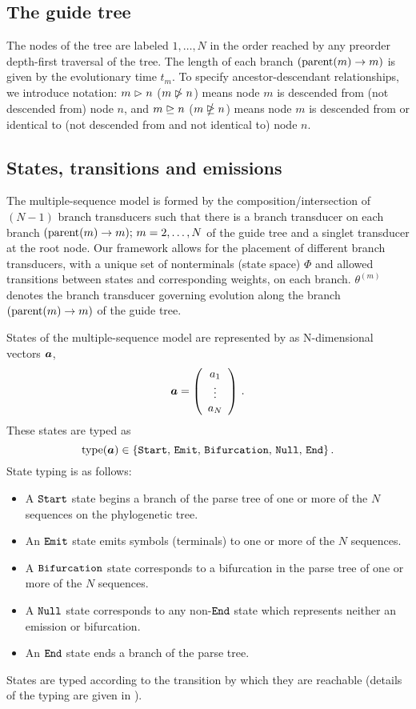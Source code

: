 \documentclass[10pt]{article}
\begin{document}
\subsection{The guide tree}
The nodes of the tree are labeled $1,\dots,N$ in the order reached by any preorder depth-first traversal of the tree.
The length of each branch $(\operatorname{parent}(m) \to m)$ is given by the evolutionary time $t_m$.
To specify ancestor-descendant relationships, we introduce notation:
$m \vartriangleright n$ ($m \ntriangleright n$) means node $m$ is descended from (not descended from) node $n$, and
$m \trianglerighteq n$ ($m \ntrianglerighteq n$) means node $m$ is descended from or identical to (not descended from and not identical to) node $n$.

\subsection{States, transitions and emissions}
The multiple-sequence model is formed by the composition/intersection of $(N-1)$ branch transducers 
such that there is a branch transducer on each branch $(\operatorname{parent}(m) \to m);\, m = 2,\dots,N$ of the guide tree and a singlet transducer at the root node.
Our framework allows for the placement of different branch transducers, with a unique set of nonterminals (state space) $\Phi$ and
allowed transitions between states and corresponding weights, on each branch.  $\theta^{(m)}$ denotes 
the branch transducer governing evolution along the branch $(\operatorname{parent}(m) \to m)$ of the guide tree.

States of the multiple-sequence model are represented by as N-dimensional vectors $\boldsymbol{a}$,
\[ \boldsymbol{a} = \left(\begin{array}{c}a_1\\\vdots\\a_N\end{array}\right) \, . \]
These states are typed as
\[ \operatorname{type}(\boldsymbol{a}) \in \lbrace\mathtt{Start},\,\mathtt{Emit},\,\mathtt{Bifurcation},\,\mathtt{Null},\,\mathtt{End}\rbrace \, . \]
State typing is as follows:
\begin{itemize}
  \item A $\mathtt{Start}$ state begins a branch of the parse tree of one or more of the $N$ sequences on the phylogenetic tree.
  \item An $\mathtt{Emit}$ state emits symbols (terminals) to one or more of the $N$ sequences.
  \item A $\mathtt{Bifurcation}$ state corresponds to a bifurcation in the parse tree of
    one or more of the $N$ sequences.
  \item A $\mathtt{Null}$ state corresponds to any non-$\mathtt{End}$ state which represents neither
    an emission or bifurcation.
  \item An $\mathtt{End}$ state ends a branch of the parse tree.
\end{itemize}
States are typed according to the transition by which they are reachable
(details of the typing are given in ).
\end{document}
